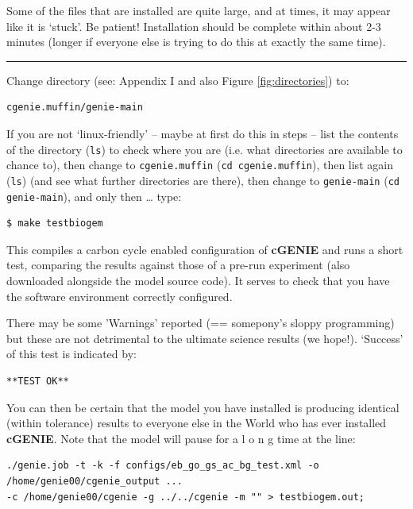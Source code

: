 \documentclass[11pt,fleqn]{book} %
\begin{document}
Some of the files that are installed are quite large, and at times, it may appear like it is ‘stuck’. Be patient! Installation should be complete within about 2-3 minutes (longer if everyone else is trying to do this at exactly the same time).

\vspace{1mm}
\noindent\rule{4cm}{0.1mm}
\vspace{2mm}

Change directory (see: Appendix I and also Figure \ref{fig:directories}) to:

\begin{verbatim}
cgenie.muffin/genie-main
\end{verbatim}

\noindent If you are not ‘linux-friendly’ – maybe at first do this in steps – list the contents of the directory (\texttt{ls}) to check where you are (i.e. what directories are available to chance to), then change to \texttt{cgenie.muffin} (\texttt{cd cgenie.muffin}), then list again (\texttt{ls}) (and see what further directories are there), then change to \texttt{genie-main} (\texttt{cd genie-main}), and only then … type:

\begin{verbatim}
$ make testbiogem
\end{verbatim}

This compiles a carbon cycle enabled configuration of \textbf{cGENIE} and runs a short test, comparing the results against those of a pre-run experiment (also downloaded alongside the model source code). It serves to check that you have the software environment correctly configured.

There may be some ’Warnings’ reported (== somepony’s sloppy programming) but these are not detrimental to the ultimate science results (we hope!). ‘Success’ of this test is indicated by:

\begin{verbatim}
**TEST OK**
\end{verbatim}

You can then be certain that the model you have installed is producing identical (within tolerance) results to everyone else in the World who has ever installed \textbf{cGENIE}. Note that the model will pause for a l o n g time at the line: 

\begin{verbatim}
./genie.job -t -k -f configs/eb_go_gs_ac_bg_test.xml -o /home/genie00/cgenie_output ...
-c /home/genie00/cgenie -g ../../cgenie -m "" > testbiogem.out;
\end{verbatim}
\end{document}
